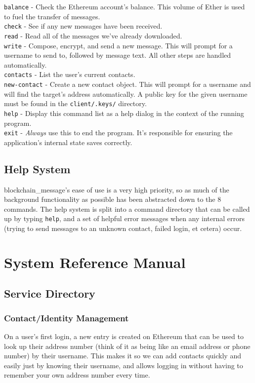 \documentclass[titlepage]{report}
\begin{document}
{\raggedright{}
    \texttt{balance} - Check the Ethereum account's balance. This volume of Ether is used to fuel the transfer of messages.\\
    \texttt{check} - See if any new messages have been received.\\
    \texttt{read} - Read all of the messages we've already downloaded.\\
    \texttt{write} - Compose, encrypt, and send a new message. This will prompt for a username to send to, followed by message text. All other steps are handled automatically.\\
    \texttt{contacts} - List the user's current contacts.\\
    \texttt{new-contact} - Create a new contact object. This will prompt for a username and will find the target's address automatically. A public key for the given username must be found in the \texttt{client/.keys/} directory.\\
    \texttt{help} - Display this command list as a help dialog in the context of the running program.\\
    \texttt{exit} - \textit{Always} use this to end the program. It's responsible for ensuring the application's internal state saves correctly.\\
}

\subsection{Help System}
blockchain\_message's ease of use is a very high priority, so as much of the background functionality as possible has been abstracted down to the 8 commands. The help system is split into a command directory that can be called up by typing \texttt{help}, and a set of helpful error messages when any internal errors (trying to send messages to an unknown contact, failed login, et cetera) occur.

\section{System Reference Manual}
\subsection{Service Directory}

\subsubsection{Contact/Identity Management}
On a user's first login, a new entry is created on \gls{Ethereum} that can be used to look up their address number (think of it as being like an email address or phone number) by their username. This makes it so we can add contacts quickly and easily just by knowing their username, and allows logging in without having to remember your own address number every time.
\end{document}
